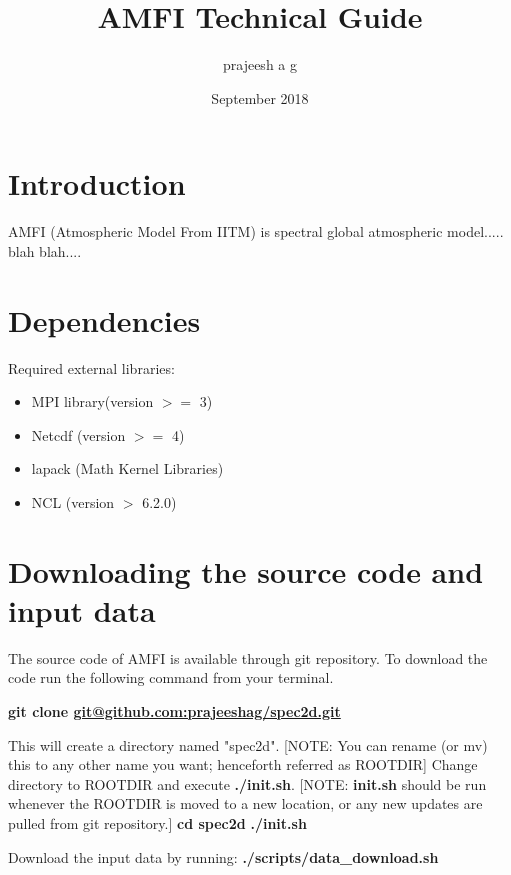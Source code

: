 \documentclass{article}
\title{AMFI Technical Guide}
\author{prajeesh a g }
\date{September 2018}
\begin{document}
\maketitle

\section{Introduction}
AMFI (Atmospheric Model From IITM) is spectral global atmospheric model..... blah blah....
\section{Dependencies}
Required external libraries:
\begin{itemize}
    \item MPI library(version $>=$ 3)
    \item Netcdf (version $>=$ 4)
    \item lapack (Math Kernel Libraries)
    \item NCL (version $>$ 6.2.0)
\end{itemize}
\section{Downloading the source code and input data}
The source code of AMFI is available through git repository. To download the code run the following command from your terminal.

\textbf{git clone \url{git@github.com:prajeeshag/spec2d.git}}

This will create a directory named "spec2d". [NOTE: You can rename (or mv) this to any other name you want; henceforth referred as ROOTDIR]\newline
Change directory to ROOTDIR and execute \textbf{./init.sh}. [NOTE: \textbf{init.sh} should be run whenever the ROOTDIR is moved to a new location, or any new updates are pulled from git repository.]\newline
\textbf{cd spec2d} \newline
\textbf{./init.sh}

Download the input data by running:
\textbf{./scripts/data\_download.sh}
\end{document}
